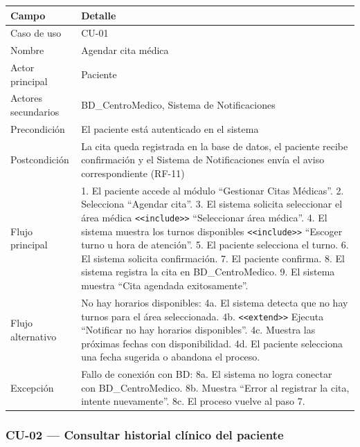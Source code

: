 \documentclass[11pt,a4paper]{article}
\begin{document}
	\begin{longtable}{p{} p{} }
		
		
		\toprule
		\textbf{Campo} &
		\textbf{Detalle}  \\
		\midrule
		\endhead
		
		Caso de uso & CU-01 \\
		Nombre & Agendar cita médica \\
		Actor principal & Paciente \\
		Actores secundarios & BD\_CentroMedico, Sistema de Notificaciones \\
		Precondición & El paciente está autenticado en el sistema \\
		Postcondición & La cita queda registrada en la base de datos, el paciente recibe confirmación y el Sistema de Notificaciones envía el aviso correspondiente (RF-11) \\
		Flujo principal & 1. El paciente accede al módulo ``Gestionar Citas Médicas''. 2. Selecciona ``Agendar cita''. 3. El sistema solicita seleccionar el área médica \texttt{<<include>>} ``Seleccionar área médica''. 4. El sistema muestra los turnos disponibles \texttt{<<include>>} ``Escoger turno u hora de atención''. 5. El paciente selecciona el turno. 6. El sistema solicita confirmación. 7. El paciente confirma. 8. El sistema registra la cita en BD\_CentroMedico. 9. El sistema muestra ``Cita agendada exitosamente''. \\
		Flujo alternativo & No hay horarios disponibles: 4a. El sistema detecta que no hay turnos para el área seleccionada. 4b. \texttt{<<extend>>} Ejecuta ``Notificar no hay horarios disponibles''. 4c. Muestra las próximas fechas con disponibilidad. 4d. El paciente selecciona una fecha sugerida o abandona el proceso. \\
		Excepción & Fallo de conexión con BD: 8a. El sistema no logra conectar con BD\_CentroMedico. 8b. Muestra ``Error al registrar la cita, intente nuevamente''. 8c. El proceso vuelve al paso 7. \\
		\bottomrule
	\end{longtable}
	
	\subsubsection{CU-02 --- Consultar historial clínico del paciente}
	
\end{document}

